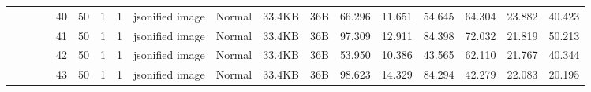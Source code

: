 \begin{landscape}
\begin{table}[]
{\begin{tabular}{@{}ccccllllllllllllll@{}}
                                                                                   &                              &                                &                                                                                                          & 40                                                    & 50                                       & 1                                          & 1                                 & jsonified image                  & Normal                             & 33.4KB                                        & 36B                                             & 66.296                  & 11.651   & 54.645                       & 64.304                  & 23.882   & 40.423                       \\
                                                                                   &                              &                                &                                                                                                          & 41                                                    & 50                                       & 1                                          & 1                                 & jsonified image                  & Normal                             & 33.4KB                                        & 36B                                             & 97.309                  & 12.911   & 84.398                       & 72.032                  & 21.819   & 50.213                       \\
                                                                                   &                              &                                &                                                                                                          & 42                                                    & 50                                       & 1                                          & 1                                 & jsonified image                  & Normal                             & 33.4KB                                        & 36B                                             & 53.950                  & 10.386   & 43.565                       & 62.110                  & 21.767   & 40.344                       \\
                                                                                   &                              &                                &                                                                                                          & 43                                                    & 50                                       & 1                                          & 1                                 & jsonified image                  & Normal                             & 33.4KB                                        & 36B                                             & 98.623                  & 14.329   & 84.294                       & 42.279                  & 22.083   & 20.195                       \\

\end{tabular}}
\end{table}
\end{landscape}
